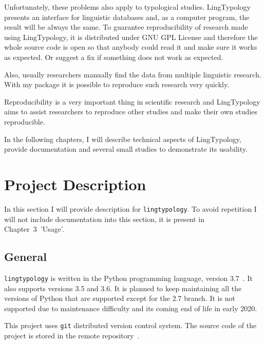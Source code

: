 \documentclass[a4paper,12pt]{article}
\begin{document}
Unfortunately, these problems also apply to typological studies. LingTypology presents an interface for linguistic databases and, as a computer program, the result will be always the same. To guarantee reproducibility of research made using LingTypology, it is distributed under GNU GPL License and therefore the whole source code is open so that anybody could read it and make sure it works as expected. Or suggest a fix if something does not work as expected.

Also, usually researchers manually find the data from multiple linguistic research. With my package it is possible to reproduce such research very quickly.

Reproducibility is a very important thing in scientific research and LingTypology aims to assist researchers to reproduce other studies and make their own studies reproducible.

In the following chapters, I will describe technical aspects of LingTypology, provide documentation and several small studies to demonstrate its usability.

\newpage


\section{Project Description}
In this section I will provide description for \texttt{lingtypology}. To avoid repetition I will not include documentation into this section, it is present in Chapter~3~'Usage'.

\subsection{General}
\texttt{lingtypology} is written in the Python programming language, version 3.7~\parencite{python}. It also supports versions 3.5 and 3.6. It is planned to keep maintaining all the versions of Python that are supported except for the 2.7 branch. It is not supported due to maintenance difficulty and its coming end of life in early 2020.

This project uses \texttt{git} distributed version control system. The source code of the project is stored in the remote repository~\parencite{MichaelVoronov2019}.
\end{document}
